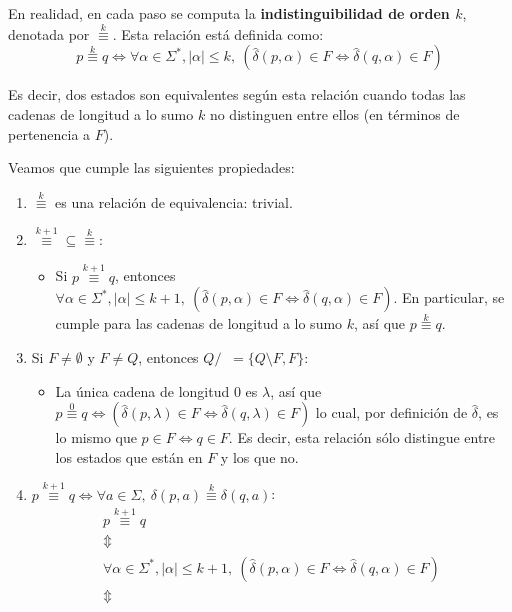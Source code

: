 En realidad, en cada paso se computa la \textbf{indistinguibilidad de orden $k$}, denotada por $\overset{k}{\equiv}$. Esta relación está definida como:
$$
    p \overset{k}{\equiv} q \iff \forall \alpha \in \Sigma^*, |\alpha| \leq k,\ (\hat\delta(p, \alpha) \in F \iff \hat\delta(q, \alpha) \in F)
$$

Es decir, dos estados son equivalentes según esta relación cuando todas las cadenas de longitud a lo sumo $k$ no distinguen entre ellos (en términos de pertenencia a $F$).

Veamos que cumple las siguientes propiedades:
\begin{enumerate}
    \item $\overset{k}{\equiv}$ es una relación de equivalencia: trivial.
    \item $\overset{k + 1}{\equiv} \subseteq \overset{k}{\equiv}$:
          \begin{itemize}
              \item Si $p \overset{k + 1}{\equiv} q$, entonces $\forall \alpha \in \Sigma^*, |\alpha| \leq k + 1,\ (\hat\delta(p, \alpha) \in F \iff \hat\delta(q, \alpha) \in F)$. En particular, se cumple para las cadenas de longitud a lo sumo $k$, así que $p \overset{k}{\equiv} q$.
          \end{itemize}
    \item Si $F \neq \emptyset$ y $F \neq Q$, entonces $Q / \mathop{\overset{0}{\equiv}} = \{Q \setminus F, F\}$:
          \begin{itemize}
              \item La única cadena de longitud $0$ es $\lambda$, así que $p \overset{0}{\equiv} q \iff (\hat\delta(p, \lambda) \in F \iff \hat\delta(q, \lambda) \in F)$ lo cual, por definición de $\hat\delta$, es lo mismo que $p \in F \iff q \in F$. Es decir, esta relación sólo distingue entre los estados que están en $F$ y los que no.
          \end{itemize}
    \item $p \overset{k + 1}{\equiv} q \iff \forall a \in \Sigma,\ \delta(p, a) \overset{k}{\equiv} \delta(q, a)$:
          \begin{gather*}
              p \overset{k + 1}{\equiv} q \\
              \Updownarrow \\
              \forall \alpha \in \Sigma^*, |\alpha| \leq k + 1,\ (\hat\delta(p, \alpha) \in F \iff \hat\delta(q, \alpha) \in F) \\
              \Updownarrow \\

\end{gather*}
\end{enumerate}
